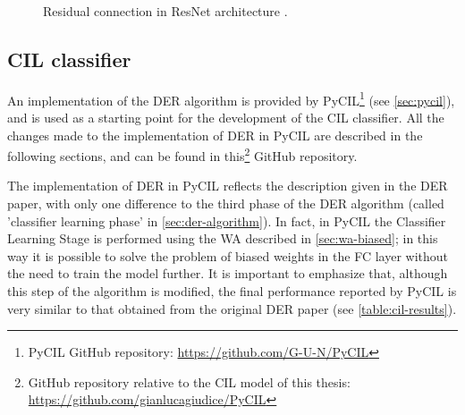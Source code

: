 \begin{figure}%
	\centering
	\hfill
	\caption{Residual connection in ResNet architecture \cite{he2016deep}.}%
	\label{fig:residual-connection}%
\end{figure}

\subsection{CIL classifier}
An implementation of the DER algorithm is provided by PyCIL\footnote{PyCIL GitHub repository: \href{https://github.com/G-U-N/PyCIL}{https://github.com/G-U-N/PyCIL}} (see \autoref{sec:pycil}), and is used as a starting point for the development of the CIL classifier. 
All the changes made to the implementation of DER in PyCIL are described in the following sections, and can be found in this\footnote{GitHub repository relative to the CIL model of this thesis: \\ \href{https://github.com/gianlucagiudice/PyCIL}{https://github.com/gianlucagiudice/PyCIL}} GitHub repository.

The implementation of DER in PyCIL reflects the description given in the DER paper, with only one difference to the third phase of the DER algorithm (called 'classifier learning phase' in \autoref{sec:der-algorithm}). 
In fact, in PyCIL the Classifier Learning Stage is performed using the WA described in \autoref{sec:wa-biased}; in this way it is possible to solve the problem of biased weights in the FC layer without the need to train the model further.
It is important to emphasize that, although this step of the algorithm is modified, the final performance reported by PyCIL is very similar to that obtained from the original DER paper (see \autoref{table:cil-results}).

